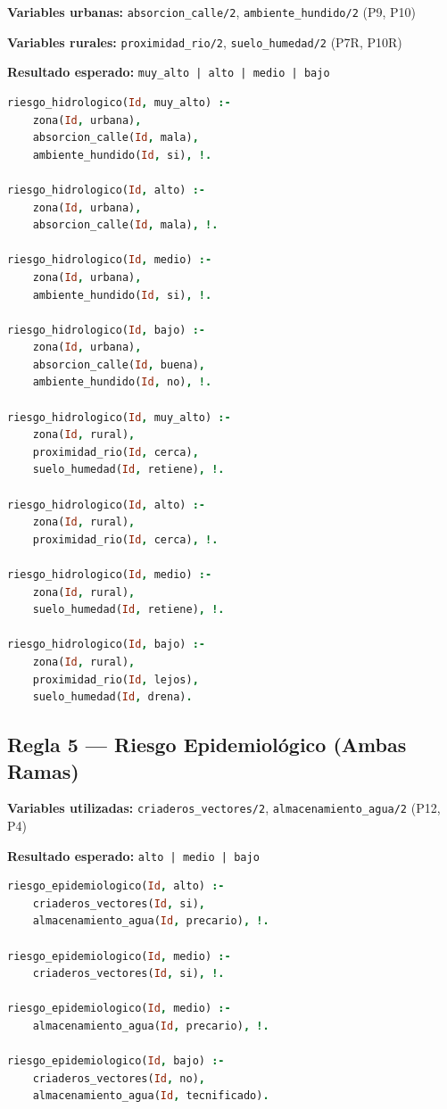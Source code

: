 \documentclass[12pt, letterpaper]{article}
\begin{document}
\textbf{Variables urbanas:} \texttt{absorcion\_calle/2}, \texttt{ambiente\_hundido/2} (P9, P10)

\textbf{Variables rurales:} \texttt{proximidad\_rio/2}, \texttt{suelo\_humedad/2} (P7R, P10R)

\textbf{Resultado esperado:} \texttt{muy\_alto | alto | medio | bajo}

\begin{lstlisting}[language=Prolog, caption={Reglas de riesgo hidrológico}]
riesgo_hidrologico(Id, muy_alto) :-
    zona(Id, urbana),
    absorcion_calle(Id, mala),
    ambiente_hundido(Id, si), !.

riesgo_hidrologico(Id, alto) :-
    zona(Id, urbana),
    absorcion_calle(Id, mala), !.

riesgo_hidrologico(Id, medio) :-
    zona(Id, urbana),
    ambiente_hundido(Id, si), !.

riesgo_hidrologico(Id, bajo) :-
    zona(Id, urbana),
    absorcion_calle(Id, buena),
    ambiente_hundido(Id, no), !.

riesgo_hidrologico(Id, muy_alto) :-
    zona(Id, rural),
    proximidad_rio(Id, cerca),
    suelo_humedad(Id, retiene), !.

riesgo_hidrologico(Id, alto) :-
    zona(Id, rural),
    proximidad_rio(Id, cerca), !.

riesgo_hidrologico(Id, medio) :-
    zona(Id, rural),
    suelo_humedad(Id, retiene), !.

riesgo_hidrologico(Id, bajo) :-
    zona(Id, rural),
    proximidad_rio(Id, lejos),
    suelo_humedad(Id, drena).
\end{lstlisting}

\subsection{Regla 5 — Riesgo Epidemiológico (Ambas Ramas)}

\textbf{Variables utilizadas:} \texttt{criaderos\_vectores/2}, \texttt{almacenamiento\_agua/2} (P12, P4)

\textbf{Resultado esperado:} \texttt{alto | medio | bajo}

\begin{lstlisting}[language=Prolog, caption={Reglas de riesgo epidemiológico}]
riesgo_epidemiologico(Id, alto) :-
    criaderos_vectores(Id, si),
    almacenamiento_agua(Id, precario), !.

riesgo_epidemiologico(Id, medio) :-
    criaderos_vectores(Id, si), !.

riesgo_epidemiologico(Id, medio) :-
    almacenamiento_agua(Id, precario), !.

riesgo_epidemiologico(Id, bajo) :-
    criaderos_vectores(Id, no),
    almacenamiento_agua(Id, tecnificado).
\end{lstlisting}
\end{document}
